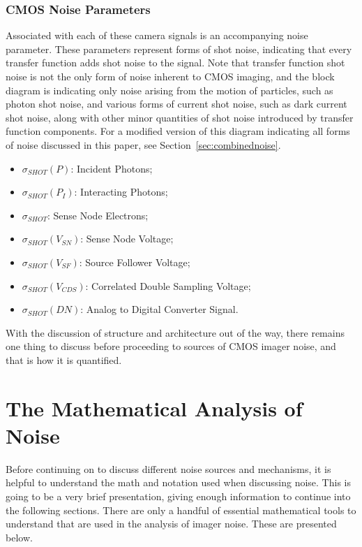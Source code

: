 \documentclass[10pt]{article}
\begin{document}
\subsubsection{CMOS Noise Parameters}
\label{sec:noiseparam}

Associated with each of these camera signals is an accompanying noise parameter. These parameters represent forms of shot noise, indicating that every transfer function adds shot noise to the signal. Note that transfer function shot noise is not the only form of noise inherent to CMOS imaging, and the block diagram is indicating only noise arising from the motion of particles, such as photon shot noise, and various forms of current shot noise, such as dark current shot noise, along with other minor quantities of shot noise introduced by transfer function components. For a modified version of this diagram indicating all forms of noise discussed in this paper, see Section~\ref{sec:combinednoise}.

\begin{itemize}[noitemsep]
\item \textbf{\boldmath$\sigma_{SHOT}(P)$}: Incident Photons;
\item \textbf{\boldmath$\sigma_{SHOT}(P_I)$}: Interacting Photons;
\item \textbf{\boldmath$\sigma_{SHOT}$}:  Sense Node Electrons; 
\item \textbf{\boldmath$\sigma_{SHOT}(V_{SN})$}: Sense Node Voltage;
\item \textbf{\boldmath$\sigma_{SHOT}(V_{SF})$}: Source Follower Voltage;
\item \textbf{\boldmath$\sigma_{SHOT}(V_{CDS})$}: Correlated Double Sampling Voltage;
\item \textbf{\boldmath$\sigma_{SHOT}(DN)$}: Analog to Digital Converter Signal.
\end{itemize}

With the discussion of structure and architecture out of the way, there remains one thing to discuss before proceeding to sources of CMOS imager noise, and that is how it is quantified.

\section{The Mathematical Analysis of Noise}

Before continuing on to discuss different noise sources and mechanisms, it is helpful to understand the math and notation used when discussing noise. This is going to be a very brief presentation, giving enough information to continue into the following sections. There are only a handful of essential mathematical tools to understand that are used in the analysis of imager noise. These are presented below.
\end{document}

